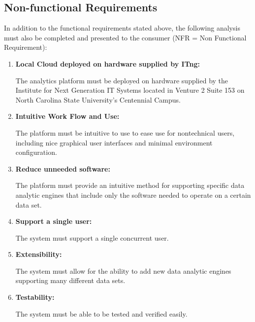 \subsection{Non-functional Requirements}
\label{sec:nonfunc-reqs}

In addition to the functional requirements stated above, the following
analysis must also be completed and presented to the consumer (NFR =
Non Functional Requirement):
\begin{enumerate}[label=\textbf{NFR-\arabic*}]

\item \textbf{Local Cloud deployed on hardware supplied by ITng:}

  The analytics platform must be deployed on hardware supplied by the
  Institute for Next Generation IT Systems located in Venture 2 Suite
  153 on North Carolina State University's Centennial Campus. 



\item \textbf{Intuitive Work Flow and Use:}

  The platform must be intuitive to use to ease use for nontechnical
  users, including nice graphical user interfaces and minimal
  environment configuration.

\item \textbf{Reduce unneeded software:}

  The platform must provide an intuitive method for supporting
  specific data analytic engines that include only the software needed
  to operate on a certain data set.

\item \textbf{Support a single user:}

  The system must support a single concurrent user.

\item \textbf{Extensibility:}

  The system must allow for the ability to add new data analytic
  engines supporting many different data sets. 
  
\item \textbf{Testability:}

  The system must be able to be tested and verified easily.

\end{enumerate}

